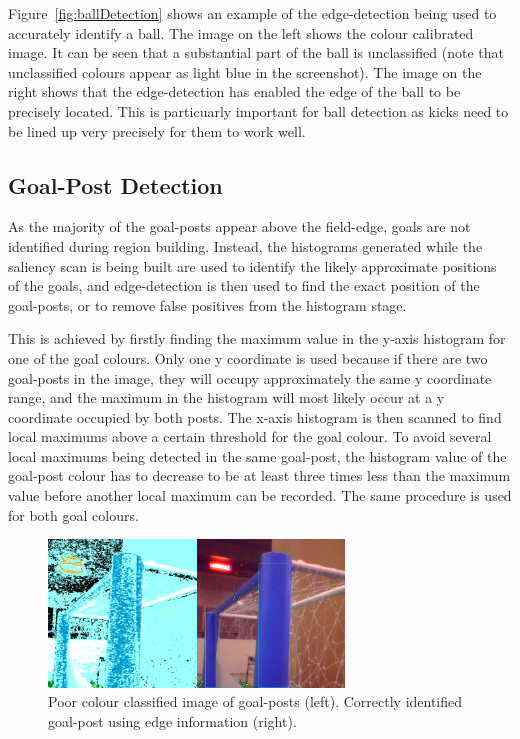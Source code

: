 \documentclass[runningheads,a4paper]{llncs}
\begin{document}
Figure~\ref{fig:ballDetection} shows an example of the edge-detection being used
to accurately identify a ball. The image on the left shows the colour calibrated
image. It can be seen that a substantial part of the ball is unclassified (note
that unclassified colours appear as light blue in the screenshot). The image on
the right shows that the edge-detection has enabled the edge of the ball to be
precisely located. This is particuarly important for ball detection as kicks
need to be lined up very precisely for them to work well.

\subsection{Goal-Post Detection}

As the majority of the goal-posts appear above the field-edge, goals are not identified during region building. Instead, the histograms generated while the saliency scan is being built are used to identify the likely approximate positions of the goals, and edge-detection is then used to find the exact position of the goal-posts, or to remove false positives from the histogram stage.

This is achieved by firstly finding the maximum value in the y-axis histogram
for one of the goal colours.  Only one y coordinate is used because if there are
two goal-posts in the image, they will occupy approximately the same y
coordinate range, and the maximum in the histogram will most likely occur at a y
coordinate occupied by both posts. The x-axis histogram is then scanned to find
local maximums above a certain threshold for the goal colour. To avoid several
local maximums being detected in the same goal-post, the histogram value of the
goal-post colour has to decrease to be at least three times less than the
maximum value before another local maximum can be recorded. The same procedure
is used for both goal colours.

\begin{figure} [ht]
\centering
\includegraphics[width=0.7\textwidth]{figures/goalDetection.png}
\caption{Poor colour classified image of goal-posts (left). Correctly identified
goal-post using edge information (right).} \label{figGoal}
\end{figure}
\end{document}
